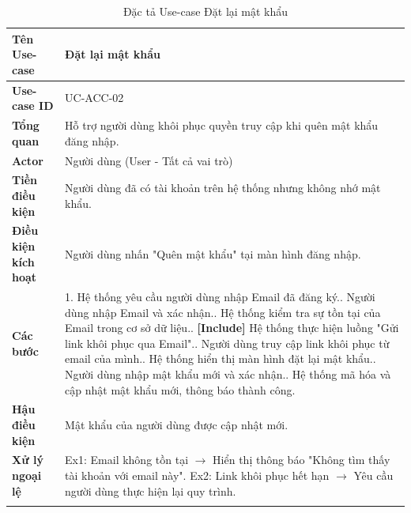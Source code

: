 \newpage
\begin{longtable}{|p{3.5cm}|p{11.5cm}|}
    \hline
    \textbf{Tên Use-case} & \textbf{Đặt lại mật khẩu} \\
    \hline
    \textbf{Use-case ID} & UC-ACC-02 \\
    \hline
    \textbf{Tổng quan} & Hỗ trợ người dùng khôi phục quyền truy cập khi quên mật khẩu đăng nhập. \\
    \hline
    \textbf{Actor} & Người dùng (User - Tất cả vai trò) \\
    \hline
    \textbf{Tiền điều kiện} & Người dùng đã có tài khoản trên hệ thống nhưng không nhớ mật khẩu. \\
    \hline
    \textbf{Điều kiện kích hoạt} & Người dùng nhấn "Quên mật khẩu" tại màn hình đăng nhập. \\
    \hline
    \textbf{Các bước} & 
    1. Hệ thống yêu cầu người dùng nhập Email đã đăng ký.\newline
    2. Người dùng nhập Email và xác nhận.\newline
    3. Hệ thống kiểm tra sự tồn tại của Email trong cơ sở dữ liệu.\newline
    4. \textbf{[Include]} Hệ thống thực hiện luồng "Gửi link khôi phục qua Email".\newline
    5. Người dùng truy cập link khôi phục từ email của mình.\newline
    6. Hệ thống hiển thị màn hình đặt lại mật khẩu.\newline
    7. Người dùng nhập mật khẩu mới và xác nhận.\newline
    8. Hệ thống mã hóa và cập nhật mật khẩu mới, thông báo thành công. \\
    \hline
    \textbf{Hậu điều kiện} & Mật khẩu của người dùng được cập nhật mới. \\
    \hline
    \textbf{Xử lý ngoại lệ} & 
    Ex1: Email không tồn tại $\rightarrow$ Hiển thị thông báo "Không tìm thấy tài khoản với email này".\newline
    Ex2: Link khôi phục hết hạn $\rightarrow$ Yêu cầu người dùng thực hiện lại quy trình. \\
    \hline
    \caption{Đặc tả Use-case Đặt lại mật khẩu}
\end{longtable}

